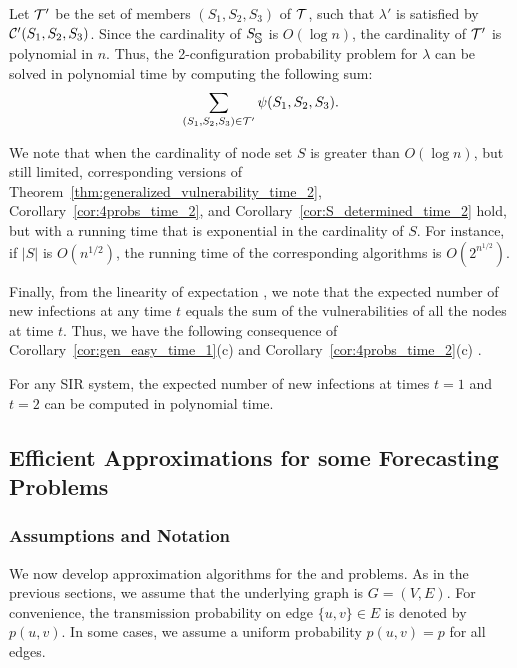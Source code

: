 Let $\cal T'$ be the set of members $(S_1, S_2, S_3)$ of $\cal T$,
such that $\lambda'$ is satisfied by $\mbox{${\cal C}$}{}'(S_1, S_2, S_3)$.
Since the cardinality of $S_{\mbox{$\mathbb{S}$}}$ is $O(\log{n})$,
the cardinality of $\cal T'$ is polynomial in $n$.
Thus, the 2-configuration probability problem for $\lambda$
can be solved in polynomial time by computing the following sum:
\[
\sum_{(S_1, S_2, S_3) \in {\cal T'} } \psi(S_1, S_2, S_3).
\]
\QED

We note that when the cardinality of node set $S$ is greater than $O(\log{n})$,
but still limited, corresponding versions  of 
Theorem~\ref{thm:generalized_vulnerability_time_2}, 
Corollary~\ref{cor:4probs_time_2}, 
and Corollary~\ref{cor:S_determined_time_2} hold,
but with a running time that is exponential in the cardinality of $S$.
For instance, if $|S|$ is $O(n^{1/2})$,
the running time of the corresponding algorithms is
$O(2^{n^{1/2}})$.

Finally, from the linearity of expectation \cite{MU-2005}, 
we note that the expected number of new infections at any time $t$ equals
the sum of the vulnerabilities of all the nodes  at time $t$.
Thus, we have the following consequence of Corollary~\ref{cor:gen_easy_time_1}(c)
and  Corollary~\ref{cor:4probs_time_2}(c) .

\begin{corollary}\label{cor:expected_number_infected_time_2}
For any SIR system,
the expected number of new infections at times $t = 1$ and 
$t = 2$ can be computed in polynomial time. \QED
\end{corollary}



\subsection{Efficient Approximations for some Forecasting Problems} 
\label{sse:fpras_expected_inf}

\subsubsection{Assumptions and Notation}

We now develop approximation algorithms for the \tTotVuls{} and \tTotInfs{} problems.
As in the previous sections, we assume that the underlying 
graph is $G=(V, E)$. 
For convenience, the transmission probability on
edge $\{u, v\}\in E$ is denoted by $p(u,v)$. 
In some cases, we assume
a uniform probability $p(u,v) = p$ for all edges.  


